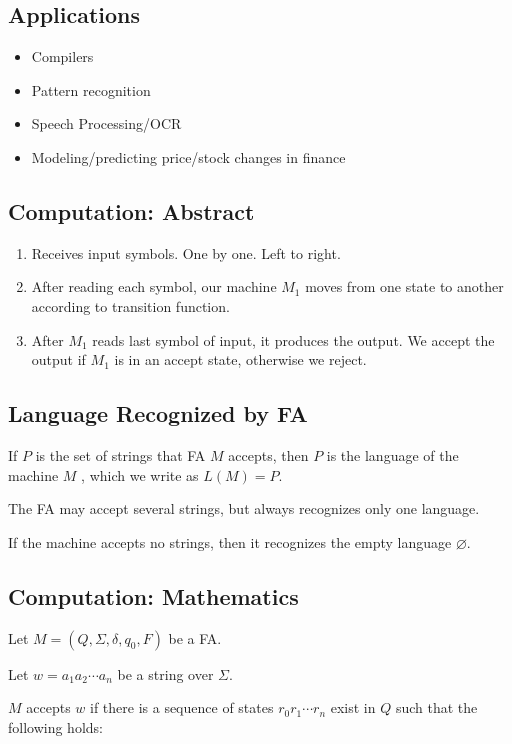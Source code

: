 \documentclass{article}
\begin{document}
\subsection*{Applications}

\begin{itemize}
\item Compilers
\item Pattern recognition
\item Speech Processing/OCR
\item Modeling/predicting price/stock changes in finance
\end{itemize}

\subsection*{Computation: Abstract}

\begin{enumerate}
\item Receives input symbols. One by one. Left to right.
\item After reading each symbol, our machine $M_1$ moves from one
  state to another according to transition function.
\item After $M_1$ reads last symbol of input, it produces the
  output. We accept the output if $M_1$ is in an accept state,
  otherwise we reject.
\end{enumerate}

\subsection*{Language Recognized by FA}

If $P$ is the set of strings that FA $M$ accepts, then $P$ is the
language of the machine $M$ , which we write as $L(M)=P$.

The FA may accept several strings, but always recognizes only one
language.

If the machine accepts no strings, then it recognizes the empty
language $\varnothing$.

\subsection*{Computation: Mathematics}

Let $M=(Q,\Sigma,\delta,q_0,F)$ be a FA.

Let $w=a_1a_2\cdots{}a_n$ be a string over $\Sigma$.

$M$ accepts $w$ if there is a sequence of states $r_0r_1\cdots{}r_n$
exist in $Q$ such that the following holds:
\end{document}
